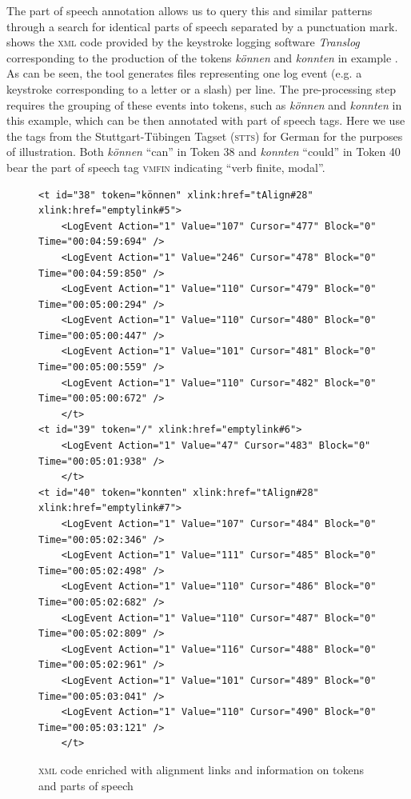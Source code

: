 \documentclass[output=paper]{LSP/langsci}
\begin{document}
The part of speech annotation allows us to query this and similar patterns through a search for identical parts of speech separated by a punctuation mark. 
 shows the \textsc{xml} code provided by the keystroke logging software \textit{Translog} corresponding to the production of the tokens \textit{können} and \textit{konnten} in example . As can be seen, the tool generates files representing one log event (e.g. a keystroke corresponding to a letter or a slash) per line. The pre-processing step requires the grouping of these events into tokens, such as \textit{können} and \textit{konnten} in this example, which can be then annotated with part of speech tags. Here we use the tags from the Stuttgart-Tübingen Tagset (\textsc{stts}) for German \citep{Schiller1999} for the purposes of illustration. Both \textit{können} “can” in Token 38 and \textit{konnten} “could” in Token 40 bear the part of speech tag \textsc{vmfin} indicating “verb finite, modal”. 


\begin{figure}

\caption{\textsc{xml} code enriched with alignment links and information on tokens and parts of speech} \label{fig:1:2}
\begin{lstlisting}
<t id="38" token="können" xlink:href="tAlign#28" xlink:href="emptylink#5">
    <LogEvent Action="1" Value="107" Cursor="477" Block="0" Time="00:04:59:694" />
    <LogEvent Action="1" Value="246" Cursor="478" Block="0" Time="00:04:59:850" />
    <LogEvent Action="1" Value="110" Cursor="479" Block="0" Time="00:05:00:294" />
    <LogEvent Action="1" Value="110" Cursor="480" Block="0" Time="00:05:00:447" />
    <LogEvent Action="1" Value="101" Cursor="481" Block="0" Time="00:05:00:559" />
    <LogEvent Action="1" Value="110" Cursor="482" Block="0" Time="00:05:00:672" />
	</t>
<t id="39" token="/" xlink:href="emptylink#6">
    <LogEvent Action="1" Value="47" Cursor="483" Block="0" Time="00:05:01:938" />
	</t>
<t id="40" token="konnten" xlink:href="tAlign#28" xlink:href="emptylink#7">
    <LogEvent Action="1" Value="107" Cursor="484" Block="0" Time="00:05:02:346" />
    <LogEvent Action="1" Value="111" Cursor="485" Block="0" Time="00:05:02:498" />
    <LogEvent Action="1" Value="110" Cursor="486" Block="0" Time="00:05:02:682" />
    <LogEvent Action="1" Value="110" Cursor="487" Block="0" Time="00:05:02:809" />
    <LogEvent Action="1" Value="116" Cursor="488" Block="0" Time="00:05:02:961" />
    <LogEvent Action="1" Value="101" Cursor="489" Block="0" Time="00:05:03:041" />
    <LogEvent Action="1" Value="110" Cursor="490" Block="0" Time="00:05:03:121" />
	</t>
\end{lstlisting}

\end{figure} 
\end{document}
